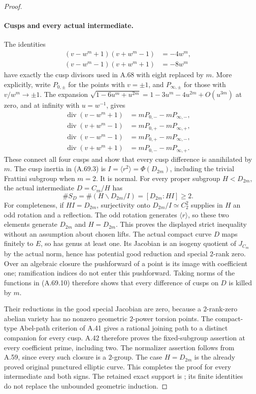 \begin{proof}
\paragraph{Cusps and every actual intermediate.}
The identities
\[
 \begin{aligned}
 (v-w^m+1)(v+w^m-1)&=-4w^m,\\
 (v-w^m-1)(v+w^m+1)&=-8w^m
 \end{aligned}                                           \tag{A.69.10}
\]
have exactly the cusp divisors used in A.68 with eight replaced
by \(m\). More explicitly, write \(P_{0,\pm}\) for the points
with \(v=\pm1\), and \(P_{\infty,\pm}\) for those with
\(v/w^m\to\pm1\). The expansion
\(\sqrt{1-6u^m+u^{2m}}=1-3u^m-4u^{2m}+O(u^{3m})\)
at zero, and at infinity with \(u=w^{-1}\), gives
\[
 \begin{aligned}
 \operatorname{div}(v-w^m+1)&=mP_{0,-}-mP_{\infty,-},\\
 \operatorname{div}(v+w^m-1)&=mP_{0,+}-mP_{\infty,+},\\
 \operatorname{div}(v-w^m-1)&=mP_{0,+}-mP_{\infty,-},\\
 \operatorname{div}(v+w^m+1)&=mP_{0,-}-mP_{\infty,+}.
 \end{aligned}                                             \tag{A.69.12}
\]
These connect all four cusps and show that every cusp difference
is annihilated by \(m\).
The cusp inertia in (A.69.3) is
\(I=\langle r^2\rangle=\Phi(D_{2m})\), including the trivial
Frattini subgroup when \(m=2\). It is normal. For every proper
subgroup \(H<D_{2m}\), the actual intermediate
\(D=C_m/H\) has
\[
        \#S_D=\#(H\backslash D_{2m}/I)
                 =[D_{2m}:HI]\ge2.                 \tag{A.69.11}
\]
For completeness, if \(HI=D_{2m}\), surjectivity onto
\(D_{2m}/I\simeq C_2^2\) supplies in \(H\) an odd rotation
and a reflection. The odd rotation generates \(\langle r\rangle\),
so these two elements generate \(D_{2m}\) and \(H=D_{2m}\).
This proves the displayed strict inequality without an assumption
about chosen lifts. The actual compact curve \(D\) maps finitely to
\(E\), so has genus at least one. Its Jacobian is an isogeny
quotient of \(J_{C_m}\) by the actual norm, hence has potential
good reduction and special \(2\)-rank zero. Over an algebraic
closure the pushforward of a point is its image with coefficient
one; ramification indices do not enter this pushforward.
Taking norms of the functions in (A.69.10) therefore shows that
every difference of cusps on \(D\) is killed by \(m\).

Their reductions in the good special Jacobian are zero, because
a \(2\)-rank-zero abelian variety has no nonzero geometric
\(2\)-power torsion points. The compact-type Abel-path criterion
of A.41 gives a rational joining path to a distinct companion
for every cusp. A.42 therefore proves the fixed-subgroup
assertion at every coefficient prime, including two. The
normalizer assertion follows from A.59, since every such
closure is a \(2\)-group. The case \(H=D_{2m}\) is the already
proved original punctured elliptic curve. This completes the
proof for every intermediate and both signs.
The retained exact support is ;
its finite identities do not replace the unbounded geometric induction.
\end{proof}
